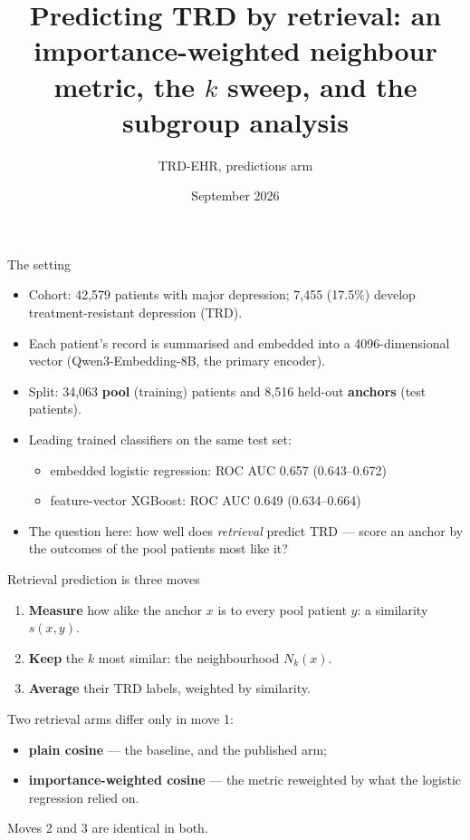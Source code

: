 \documentclass[aspectratio=169]{beamer}
\title{Predicting TRD by retrieval: an importance-weighted neighbour metric, the $k$ sweep, and the subgroup analysis}
\subtitle{TRD-EHR, predictions arm}
\date{September 2026}
\begin{document}
\begin{frame}
  \titlepage
\end{frame}

\begin{frame}{The setting}
  \begin{itemize}
    \item Cohort: 42{,}579 patients with major depression; 7{,}455 (17.5\%) develop treatment-resistant depression (TRD).
    \item Each patient's record is summarised and embedded into a 4096-dimensional vector (Qwen3-Embedding-8B, the primary encoder).
    \item Split: 34{,}063 \textbf{pool} (training) patients and 8{,}516 held-out \textbf{anchors} (test patients).
    \item Leading trained classifiers on the same test set:
      \begin{itemize}
        \item embedded logistic regression: ROC AUC 0.657 (0.643--0.672)
        \item feature-vector XGBoost: ROC AUC 0.649 (0.634--0.664)
      \end{itemize}
    \item The question here: how well does \emph{retrieval} predict TRD --- score an anchor by the outcomes of the pool patients most like it?
  \end{itemize}
\end{frame}

\begin{frame}{Retrieval prediction is three moves}
  \begin{enumerate}
    \item \textbf{Measure} how alike the anchor $x$ is to every pool patient $y$: a similarity $s(x,y)$.
    \item \textbf{Keep} the $k$ most similar: the neighbourhood $N_k(x)$.
    \item \textbf{Average} their TRD labels, weighted by similarity.
  \end{enumerate}
  \vspace{1em}
  Two retrieval arms differ only in move 1:
  \begin{itemize}
    \item \textbf{plain cosine} --- the baseline, and the published arm;
    \item \textbf{importance-weighted cosine} --- the metric reweighted by what the logistic regression relied on.
  \end{itemize}
  Moves 2 and 3 are identical in both.
\end{frame}
\end{document}
